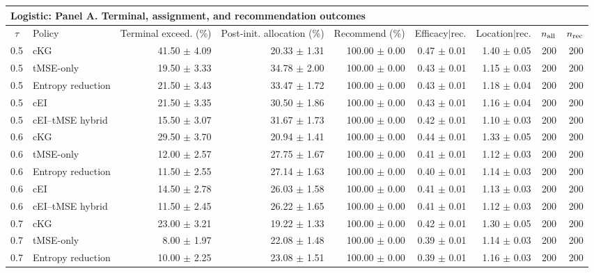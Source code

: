 \bigskip

\begin{tabular}{@{}clrrrrrrr@{}}
\multicolumn{9}{l}{\textbf{Logistic: Panel A. Terminal, assignment, and recommendation outcomes}} \\
\toprule
$\tau$ & Policy & Terminal exceed. (\%) & Post-init. allocation (\%) & Recommend (\%) & Efficacy$\mid$rec. & Location$\mid$rec. & $n_{\rm all}$ & $n_{\rm rec}$ \\
\midrule
0.5 & cKG & 41.50 $\pm$ 4.09 & 20.33 $\pm$ 1.31 & 100.00 $\pm$ 0.00 & 0.47 $\pm$ 0.01 & 1.40 $\pm$ 0.05 & 200 & 200 \\
0.5 & tMSE-only & 19.50 $\pm$ 3.33 & 34.78 $\pm$ 2.00 & 100.00 $\pm$ 0.00 & 0.43 $\pm$ 0.01 & 1.15 $\pm$ 0.03 & 200 & 200 \\
0.5 & Entropy reduction & 21.50 $\pm$ 3.43 & 33.47 $\pm$ 1.72 & 100.00 $\pm$ 0.00 & 0.43 $\pm$ 0.01 & 1.18 $\pm$ 0.04 & 200 & 200 \\
0.5 & cEI & 21.50 $\pm$ 3.35 & 30.50 $\pm$ 1.86 & 100.00 $\pm$ 0.00 & 0.43 $\pm$ 0.01 & 1.16 $\pm$ 0.04 & 200 & 200 \\
0.5 & cEI--tMSE hybrid & 15.50 $\pm$ 3.07 & 31.67 $\pm$ 1.73 & 100.00 $\pm$ 0.00 & 0.42 $\pm$ 0.01 & 1.10 $\pm$ 0.03 & 200 & 200 \\
0.6 & cKG & 29.50 $\pm$ 3.70 & 20.94 $\pm$ 1.41 & 100.00 $\pm$ 0.00 & 0.44 $\pm$ 0.01 & 1.33 $\pm$ 0.05 & 200 & 200 \\
0.6 & tMSE-only & 12.00 $\pm$ 2.57 & 27.75 $\pm$ 1.67 & 100.00 $\pm$ 0.00 & 0.41 $\pm$ 0.01 & 1.12 $\pm$ 0.03 & 200 & 200 \\
0.6 & Entropy reduction & 11.50 $\pm$ 2.55 & 27.14 $\pm$ 1.63 & 100.00 $\pm$ 0.00 & 0.40 $\pm$ 0.01 & 1.14 $\pm$ 0.03 & 200 & 200 \\
0.6 & cEI & 14.50 $\pm$ 2.78 & 26.03 $\pm$ 1.58 & 100.00 $\pm$ 0.00 & 0.41 $\pm$ 0.01 & 1.13 $\pm$ 0.03 & 200 & 200 \\
0.6 & cEI--tMSE hybrid & 11.50 $\pm$ 2.45 & 26.22 $\pm$ 1.65 & 100.00 $\pm$ 0.00 & 0.41 $\pm$ 0.01 & 1.12 $\pm$ 0.03 & 200 & 200 \\
0.7 & cKG & 23.00 $\pm$ 3.21 & 19.22 $\pm$ 1.33 & 100.00 $\pm$ 0.00 & 0.42 $\pm$ 0.01 & 1.30 $\pm$ 0.05 & 200 & 200 \\
0.7 & tMSE-only & 8.00 $\pm$ 1.97 & 22.08 $\pm$ 1.48 & 100.00 $\pm$ 0.00 & 0.39 $\pm$ 0.01 & 1.14 $\pm$ 0.03 & 200 & 200 \\
0.7 & Entropy reduction & 10.00 $\pm$ 2.25 & 23.08 $\pm$ 1.51 & 100.00 $\pm$ 0.00 & 0.39 $\pm$ 0.01 & 1.16 $\pm$ 0.03 & 200 & 200 \\

\end{tabular}
